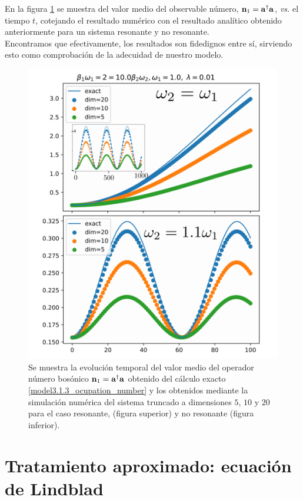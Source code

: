 \documentclass{report} %
\numberwithin{equation}{section}
\begin{document}
En la figura \ref{model3.1.3_fig1} se muestra del valor medio del observable número, ${\bf n}_1={\mathbf a}^\dagger{\mathbf a}$, \textit{vs.} el tiempo $t$, cotejando el resultado numérico con el resultado analítico obtenido anteriormente para un sistema resonante y no resonante. \\ 

\noindent Encontramos que efectivamente, los resultados son fidedignos entre sí, sirviendo esto como comprobación de la adecuidad de nuestro modelo. 

\begin{figure}
  \centering
  \includegraphics[scale=0.65]{figs/model3.1.3_fig1.png}
  \caption{Se muestra la evolución temporal del valor medio del operador número bosónico  ${\bf n}_1={\mathbf a}^\dagger{\mathbf a}$ obtenido del cálculo exacto \eqref{model3.1.3_ocupation_number} y los obtenidos mediante la simulación
  numérica del sistema truncado a dimensiones $5$, $10$ y $20$ para el caso resonante, (figura superior) y no resonante (figura inferior). }
  \label{model3.1.3_fig1}
\end{figure}

\section{Tratamiento aproximado: ecuaci\'on de Lindblad}\label{sec3_3TratamientoApproximado}
\end{document}
